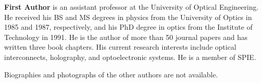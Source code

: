 \documentclass[12pt]{spieman}  %
\begin{document}
\begin{spacing}{2}

\vspace{2ex}\noindent\textbf{First Author} is an assistant professor at the University of Optical Engineering. He received his BS and MS degrees in physics from the University of Optics in 1985 and 1987, respectively, and his PhD degree in optics from the Institute of Technology in 1991.  He is the author of more than 50 journal papers and has written three book chapters. His current research interests include optical interconnects, holography, and optoelectronic systems. He is a member of SPIE.

\vspace{1ex}
\noindent Biographies and photographs of the other authors are not available.

\listoffigures
\listoftables

\end{spacing}
\end{document}
